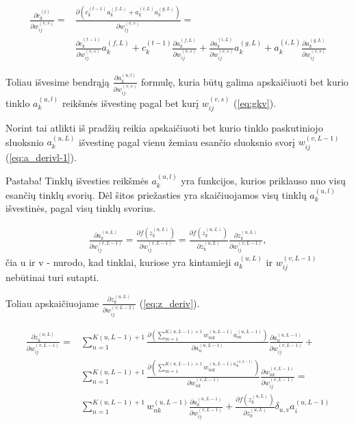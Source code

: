 \begin{equation} \label{eq:c_deriv}
  \begin{aligned}
    \frac{\partial c_k^{(t)}}{\partial w_{ij}^{(v,s)}} =&
      \frac{\partial (c_k^{(t-1)}a_k^{(f,L)}+a_k^{(i,L)}a_k^{(g,L)})}{\partial w_{ij}^{(v,s)}} =\\
  &\frac{ \partial c_k^{(t-1)}}{\partial w_{ij}^{(v,s)}}a_k^{(f,L)} +
  c_k^{(t-1)}\frac{\partial a_k^{(f,L)}}{\partial w_{ij}^{(v,s)}} +
  \frac{\partial a_k^{(i,L)}}{\partial w_{ij}^{(v,s)}}a_k^{(g,L)} +
  a_k^{(i,L)}\frac{\partial a_k^{(g,L)}}{\partial w_{ij}^{(v,s)}}
  \end{aligned}
\end{equation}

Toliau išvesime bendrąją $\frac{\partial a_k^{(u, l)}}{\partial w_{ij}^{(v,s)}}$ formulę, kuria būtų galima apskaičiuoti bet kurio tinklo $a_k^{(u, l)}$ reikšmės išvestinę pagal bet kurį $w_{ij}^{(v,s)}$ (\ref{eq:gkv}).

Norint tai atlikti iš pradžių reikia apskaičiuoti bet kurio tinklo paskutiniojo sluoksnio $a_k^{(u, L)}$ išvestinę pagal vienu žemiau esančio sluoksnio svorį $w_{ij}^{(v,L-1)}$ (\ref{eq:a_derivl-1}).

Pastaba! Tinklų išvesties reikšmės $a_k^{(u, l)}$ yra funkcijos, kurios priklauso nuo visų esančių tinklų svorių. Dėl šitos priežasties yra skaičiuojamos visų tinklų $a_k^{(u, l)}$ išvestinės, pagal visų tinklų svorius.

\begin{equation} \label{eq:a_derivl-1}
  \begin{aligned}
  \frac{\partial a_k^{(u, L)}}{\partial w_{ij}^{(v,L-1)}} =
  \frac{\partial f(z_k^{(u, L)})}{\partial w_{ij}^{(v,L-1)}} =
  \frac{\partial f(z_k^{(u, L)})}{\partial z_k^{(u,L)}} \frac{\partial z_k^{(u,L)}}{\partial w_{ij}^{(v,L-1)}},
  \end{aligned}
\end{equation}
čia u ir v - nurodo, kad tinklai, kuriose yra kintamieji $a_k^{(u, L)}$ ir $w_{ij}^{(v,L-1)}$ nebūtinai turi sutapti.

Toliau apskaičiuojame $\frac{\partial z_k^{(u,L)}}{\partial w_{ij}^{(v,L-2)}}$ (\ref{eq:z_deriv}).

\begin{equation} \label{eq:z_deriv}
  \begin{aligned}
    \frac{\partial z_k^{(u,L)}}{\partial w_{ij}^{(v,L-1)}} =& \sum_{n=1}^{K(u, L-1)+1}
      \frac{ \partial (\sum_{m=1}^{K(u,L-1)+1} w_{mk}^{(u,L-1)} a_m^{(u,L-1)} ) }{ \partial a_n^{(u,L-1)} }  \frac{\partial a_n^{(u,L-1)}}{\partial w_{ij}^{(v,L-1)}} + \\
      &\sum_{n=1}^{K(u, L-1)+1} \frac{\partial (\sum_{m=1}^{K(u,L-1)+1} w_{mk}^{(u,L-1)a_m^{(u,L-1)}} )}{\partial w_{nk}^{(v,L-1)}}
      \frac{\partial w_{nk}^{(v,L-1)}}{\partial w_{ij}^{(v,L-1)}} = \\
      &\sum_{n=1}^{K(u, L-1)+1} w_{nk}^{(u,L-1)}  \frac{\partial a_k^{(u, L-1)}}{\partial w_{ij}^{(v,L-1)}}  +  \frac{\partial f(z_k^{(u, L)})}{\partial z_k^{(u,L)}}  \delta_{u,v} a_i^{(u,L-1)}
  \end{aligned}
\end{equation}

